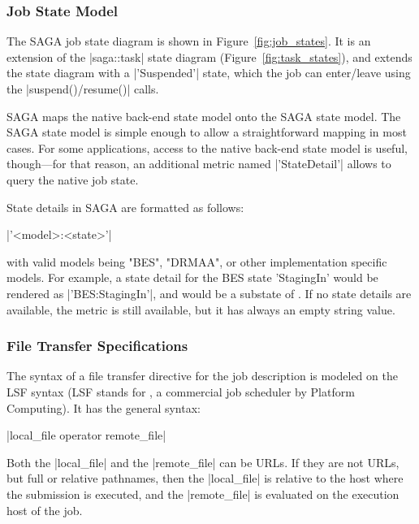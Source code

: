   \subsubsection{Job State Model}
  
    The SAGA job state diagram is shown in
    Figure~\ref{fig:job_states}.  It is an extension of the
    |saga::task| state diagram (Figure~\ref{fig:task_states}),
    and extends the state diagram with a |'Suspended'| state, which the
    job can enter/leave using the |suspend()/resume()| calls.  


    SAGA maps the native back-end state
    model onto the SAGA state model.  The SAGA state model
    is simple enough to allow a straightforward mapping
    in most cases.  For some applications, access to the native
    back-end state model is useful, though---for that reason, an
    additional metric named |'StateDetail'| allows to query the
    native job state.  

    State details in SAGA are formatted as follows:

    \shift |'<model>:<state>'|

    with valid models being "BES", "DRMAA", or other
    implementation specific models.  For example, a state detail
    for the BES state 'StagingIn' would be rendered as
    |'BES:StagingIn'|, and would be a substate of
    .  If no state details are available, the metric
    is still available, but it has always an empty string value.


    
  \subsubsection{File Transfer Specifications}
  
  The syntax of a file transfer directive for the job
  description is modeled on the LSF syntax (LSF stands for
  , a commercial job scheduler by
  Platform Computing). It has the general syntax:

    \shift |local_file operator remote_file|

    Both the |local_file| and the |remote_file| can be URLs. If
    they are not URLs, but full or relative pathnames, then the
    |local_file| is relative to the host where the submission is
    executed, and the |remote_file| is evaluated on the
    execution host of the job.

